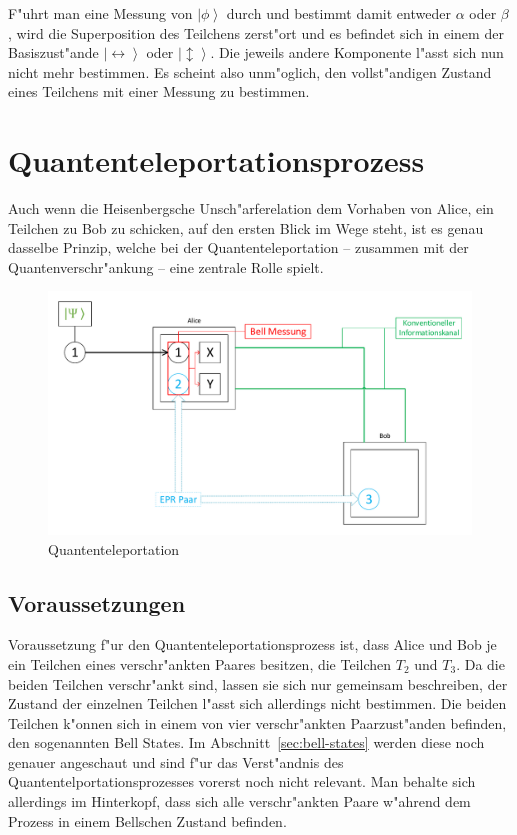 \begin{refsection}
F"uhrt man eine Messung von $\left|\phi\right\rangle$ durch und bestimmt damit entweder $\alpha$ oder $\beta$, wird die Superposition des Teilchens zerst"ort und es befindet sich in einem der Basiszust"ande $\left|\leftrightarrow\right\rangle$ oder $\left|\updownarrow\right\rangle$. Die jeweils andere Komponente l"asst sich nun nicht mehr bestimmen. Es scheint also unm"oglich, den vollst"andigen Zustand eines Teilchens mit einer Messung zu bestimmen.

\section{Quantenteleportationsprozess}
Auch wenn die Heisenbergsche Unsch"arferelation dem Vorhaben von Alice, ein Teilchen zu Bob zu schicken, auf den ersten Blick im Wege steht, ist es genau dasselbe Prinzip, welche bei der Quantenteleportation -- zusammen mit der Quantenverschr"ankung -- eine zentrale Rolle spielt.
\begin{figure}
	\center
	\includegraphics[width=1\textwidth]{teleport/image/quantum_com.pdf}
	\caption{Quantenteleportation}
	\label{Quantenteleportation}
\end{figure}

\subsection{Voraussetzungen}

Voraussetzung f"ur den Quantenteleportationsprozess ist, dass Alice und Bob je ein Teilchen eines verschr"ankten Paares besitzen, die Teilchen $T_{2}$ und $T_{3}$. Da die beiden Teilchen  verschr"ankt sind, lassen sie sich nur gemeinsam beschreiben, der Zustand der einzelnen Teilchen l"asst sich allerdings nicht bestimmen. Die beiden Teilchen k"onnen sich in einem von vier verschr"ankten Paarzust"anden befinden, den sogenannten Bell States. Im Abschnitt~\ref{sec:bell-states} werden diese noch genauer angeschaut und sind f"ur das Verst"andnis des Quantentelportationsprozesses vorerst noch nicht relevant. Man behalte sich allerdings im Hinterkopf, dass sich alle verschr"ankten Paare w"ahrend dem Prozess in einem Bellschen Zustand befinden.


\end{refsection}
